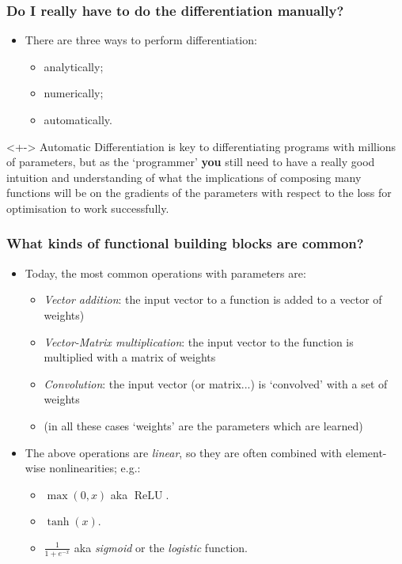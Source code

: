 \documentclass[\beamerclass]{beamer}
\DeclareMathOperator{\ReLU}{ReLU}
\begin{document}
\begin{frame}
\frametitle{Do I really have to do the differentiation manually?}

\begin{itemize}
	\item There are three ways to perform differentiation:
	\begin{itemize}
		\item<+-> analytically;
		\item<+-> numerically;
		\item<+-> automatically.
	\end{itemize}
\end{itemize}

\begin{block}<+->{}
Automatic Differentiation is key to differentiating programs with millions of parameters, but as the `programmer' \textbf{you} still need to have a really good intuition and understanding of what the implications of composing many functions will be on the gradients of the parameters with respect to the loss for optimisation to work successfully.
\end{block}

\end{frame}

\begin{frame}
\frametitle{What kinds of functional building blocks are common?}

\begin{itemize}
	\item<+-> Today, the most common operations with parameters are:
		\begin{itemize}
			\item \emph{Vector addition}: the input vector to a function is added to a vector of weights)
			\item \emph{Vector-Matrix multiplication}: the input vector to the function is multiplied with a matrix of weights
			\item \emph{Convolution}: the input vector (or matrix...) is `convolved' with a set of weights
			\item (in all these cases `weights' are the parameters which are learned)
		\end{itemize}
	\item<+-> The above operations are \emph{linear}, so they are often combined with element-wise nonlinearities; e.g.:
	\begin{itemize}
		\item $\max(0, x)$ aka $\ReLU$.
		\item $\tanh(x)$.
		\item $\frac{1}{1+e^{-x}}$ aka \emph{sigmoid} or the \emph{logistic} function. 
	\end{itemize}
\end{itemize}
\end{frame}
\end{document}

